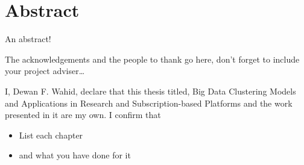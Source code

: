 \documentclass[
11pt, %
oneside, %
english, %
singlespacing, %
]{McMasterThesis} %
\begin{document}
\section*{\Huge Abstract} 
An abstract! 
\clearpage

\begin{acknowledgements}
\addchaptertocentry{\acknowledgementname} %

The acknowledgements and the people to thank go here, don't forget to include your project adviser\ldots

\end{acknowledgements}


\tableofcontents %

\listoffigures %

\listoftables %



\begin{declaration}
\addchaptertocentry{\authorshipname}

\noindent I, Dewan F. Wahid, declare that this thesis titled, Big Data Clustering Models and Applications in Research and Subscription-based Platforms and the work presented in it are my own. I confirm that

\begin{itemize} 
\item List each chapter
\item and what you have done for it
\end{itemize}
 
\end{declaration}

\label{lastoffront}
\clearpage
\end{document}
